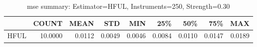 \begin{table}[ht]
\centering
\caption{mse summary: Estimator=HFUL, Instruments=250, Strength=0.30}
\begin{tabular}{lrrrrrrrr}
\toprule
 & COUNT & MEAN & STD & MIN & 25\% & 50\% & 75\% & MAX \\
\midrule
HFUL & 10.0000 & 0.0112 & 0.0049 & 0.0046 & 0.0084 & 0.0110 & 0.0147 & 0.0189 \\
\bottomrule
\end{tabular}
\end{table}
